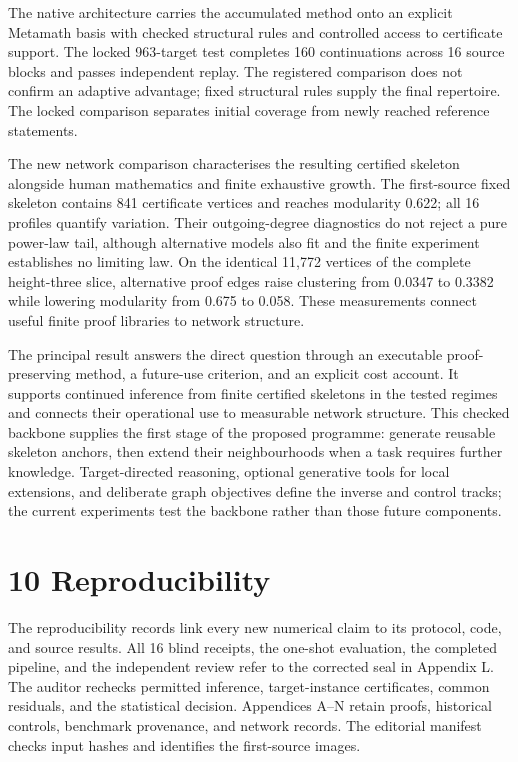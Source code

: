\documentclass[pdflatex,sn-basic,Numbered]{sn-jnl}
\begin{document}
The native architecture carries the accumulated method onto an explicit Metamath basis with checked structural rules and controlled access to certificate support. The locked 963-target test completes 160 continuations across 16 source blocks and passes independent replay. The registered comparison does not confirm an adaptive advantage; fixed structural rules supply the final repertoire. The locked comparison separates initial coverage from newly reached reference statements.

The new network comparison characterises the resulting certified skeleton alongside human mathematics and finite exhaustive growth. The first-source fixed skeleton contains 841 certificate vertices and reaches modularity 0.622; all 16 profiles quantify variation. Their outgoing-degree diagnostics do not reject a pure power-law tail, although alternative models also fit and the finite experiment establishes no limiting law. On the identical 11,772 vertices of the complete height-three slice, alternative proof edges raise clustering from 0.0347 to 0.3382 while lowering modularity from 0.675 to 0.058. These measurements connect useful finite proof libraries to network structure.

The principal result answers the direct question through an executable proof-preserving method, a future-use criterion, and an explicit cost account. It supports continued inference from finite certified skeletons in the tested regimes and connects their operational use to measurable network structure. This checked backbone supplies the first stage of the proposed programme: generate reusable skeleton anchors, then extend their neighbourhoods when a task requires further knowledge. Target-directed reasoning, optional generative tools for local extensions, and deliberate graph objectives define the inverse and control tracks; the current experiments test the backbone rather than those future components.

\section*{10 Reproducibility}\label{reproducibility}

The reproducibility records link every new numerical claim to its protocol, code, and source results. All 16 blind receipts, the one-shot evaluation, the completed pipeline, and the independent review refer to the corrected seal in Appendix L. The auditor rechecks permitted inference, target-instance certificates, common residuals, and the statistical decision. Appendices A--N retain proofs, historical controls, benchmark provenance, and network records. The editorial manifest checks input hashes and identifies the first-source images.
\end{document}
